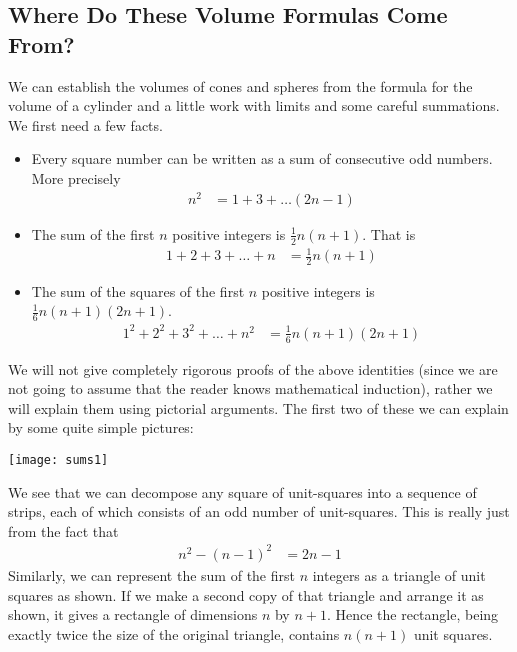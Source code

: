 \subsection{Where Do These Volume Formulas Come From?}\label{apendix volume}
We can establish the volumes of cones and spheres from the formula for the volume of a
cylinder and a little work with limits and some careful summations. We first need a few
facts.
\begin{itemize}
 \item Every square number can be written as a sum of consecutive odd numbers. More
precisely
  \begin{align*}
  n^2 &= 1 + 3 + \dots (2n-1)
\end{align*}
 \item The sum of the first $n$ positive integers is $\frac{1}{2} n(n+1)$. That is
\begin{align*}
  1 + 2 +3 +\dots +n &= \frac{1}{2}n(n+1)
\end{align*}
 \item The sum of the squares of the first $n$ positive integers is $\frac{1}{6}
n(n+1)(2n+1)$.
\begin{align*}
  1^2 + 2^2 +3^2 +\dots + n^2 &= \frac{1}{6}n(n+1)(2n+1)
\end{align*}
\end{itemize}
We will not give completely rigorous proofs of the above identities (since we are not
going to assume that the reader knows mathematical induction), rather we will explain
them using pictorial arguments. The first two of these we can explain by some quite simple
pictures:
\begin{center}
 \texttt{[image: sums1]}
\end{center}
We see that we can decompose any square of unit-squares into a sequence of strips, each
of which consists of an odd number of unit-squares. This is really just from the fact that
\begin{align*}
  n^2 - (n-1)^2 &= 2n-1
\end{align*}
Similarly, we can represent the sum of the first $n$ integers as a triangle of unit
squares as shown. If we make a second copy of that triangle and arrange it as shown, it
gives a rectangle of dimensions $n$ by $n+1$. Hence the rectangle, being exactly twice the
size of the original triangle, contains $n(n+1)$ unit squares.

